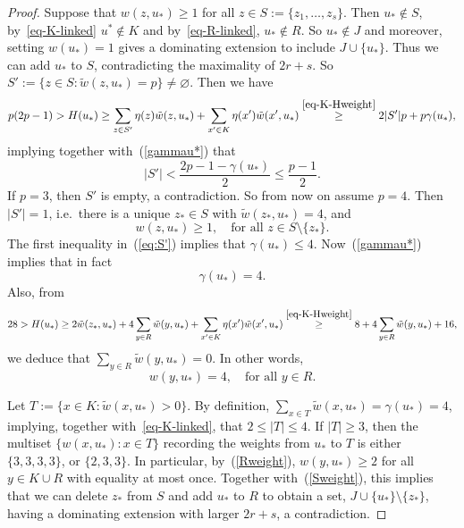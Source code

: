 \documentclass[10pt,a4paper]{article}
\theoremstyle{definition}
\begin{document}
\begin{proof}
	Suppose that $w(z,u_*) \geq 1$ for all $z \in S := \lbrace z_1,\ldots,z_s\rbrace$. Then $u_* \notin S$, by~\eqref{eq-K-linked} $u^* \notin K$ and by~\eqref{eq-R-linked}, $u_* \notin R$.
	So $u_* \notin J$ and moreover, setting $w(u_*)=1$ gives a dominating extension to include $J \cup \{u_*\}$.
	Thus we can add $u_*$ to $S$, contradicting the maximality of $2r+s$.
	So $S' := \{z \in S: \tilde{w}(z,u_*)=p\} \neq \varnothing$.
	Then  we have
	$$p(2p-1)>H(u_*)\ge \sum_{z \in S'}\eta(z)\tilde{w}(z,u_*)+\sum_{x' \in K}\eta(x')\tilde{w}(x',u_*)\stackrel{\eqref{eq-K-Hweight}}{\ge} 2|S'|p+p\gamma(u_*), $$
	implying together with~(\ref{gammau*}) that
	\begin{equation}\label{eq:S'}
		|S'|<\frac{2p-1-\gamma(u_*)}{2} \le \frac{p-1}{2}.
	\end{equation}
	If $p=3$, then $S'$ is empty, a contradiction.
	So from now on assume $p=4$.
	Then $|S'|=1$, i.e.~there is a unique $z_* \in S$ with $\tilde{w}(z_*,u_*)=4$, and 
	\begin{equation}\label{Sweight}
		w(z,u_*)\geq 1,\quad\text{for all }z \in S\setminus\lbrace z_*\rbrace.
	\end{equation}
	The first inequality in~(\ref{eq:S'}) implies that $\gamma(u_*) \leq 4$.
	Now~(\ref{gammau*}) implies that in fact $$\gamma(u_*)=4.$$
	Also, from
	$$
	28 > H(u_*) \geq 2\tilde{w}(z_*,u_*)+ 4\sum_{y \in R}\tilde{w}(y,u_*) +\sum_{x' \in K}\eta(x')\tilde{w}(x',u_*)\stackrel{\eqref{eq-K-Hweight}}{\ge} 8+4\sum_{y \in R}\tilde{w}(y,u_*)+16,
	$$
	we deduce that $\sum_{y \in R}\tilde{w}(y,u_*)=0$. In other words,
	\begin{equation}\label{Rweight}
		w(y,u_*) =4, \quad\text{for all }y \in R.
	\end{equation}
	
	Let $T := \lbrace x \in K: \tilde{w}(x,u_*) > 0\rbrace$. By definition, $ \sum_{x \in T}\tilde{w}(x,u_*)=\gamma(u_*) =4$, implying, together with~\eqref{eq-K-linked}, that $2 \leq |T| \leq 4$.
	If $|T| \geq 3$, then the multiset $\lbrace w(x,u_*) : x \in T\rbrace$ recording the weights from $u_*$ to $T$ is either $ \lbrace 3,3,3,3\rbrace$, or  $\lbrace 2,3,3\rbrace$. In particular, by~(\ref{Rweight}), $w(y,u_*) \geq 2$ for all $y \in K \cup R$ with equality at most once.
	Together with~(\ref{Sweight}), this implies that
	we can delete $z_*$ from $S$ and add $u_*$ to $R$ to obtain a set, $J\cup\{u_*\}\setminus\{z_*\}$, having a dominating extension with larger $2r+s$, a contradiction.
	

\end{proof}
\end{document}
